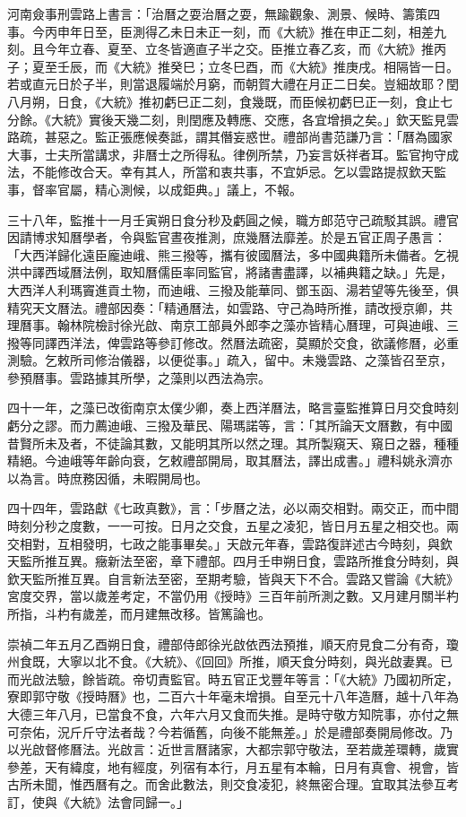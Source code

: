 河南僉事刑雲路上書言：「治曆之耍治曆之耍，無踰觀象、測景、候時、籌策四事。今丙申年日至，臣測得乙未日未正一刻，而《大統》推在申正二刻，相差九刻。且今年立春、夏至、立冬皆適直子半之交。臣推立春乙亥，而《大統》推丙子；夏至壬辰，而《大統》推癸巳；立冬巳酉，而《大統》推庚戌。相隔皆一日。若或直元日於子半，則當退履端於月窮，而朝賀大禮在月正二日矣。豈細故耶？閏八月朔，日食，《大統》推初虧巳正二刻，食幾既，而臣候初虧巳正一刻，食止七分餘。《大統》實後天幾二刻，則閏應及轉應、交應，各宜增損之矣。」欽天監見雲路疏，甚惡之。監正張應候奏詆，謂其僭妄惑世。禮部尚書范謙乃言：「曆為國家大事，士夫所當講求，非曆士之所得私。律例所禁，乃妄言妖祥者耳。監官拘守成法，不能修改合天。幸有其人，所當和衷共事，不宜妒忌。乞以雲路提叔欽天監事，督率官屬，精心測候，以成鉅典。」議上，不報。

三十八年，監推十一月壬寅朔日食分秒及虧圓之候，職方郎范守己疏駁其誤。禮官因請博求知曆學者，令與監官晝夜推測，庶幾曆法靡差。於是五官正周子愚言：「大西洋歸化遠臣龐迪峨、熊三撥等，攜有彼國曆法，多中國典籍所未備者。乞視洪中譯西域曆法例，取知曆儒臣率同監官，將諸書盡譯，以補典籍之缺。」先是，大西洋人利瑪竇進貢土物，而迪峨、三撥及能華同、鄧玉函、湯若望等先後至，俱精究天文曆法。禮部因奏：「精通曆法，如雲路、守己為時所推，請改授京卿，共理曆事。翰林院檢討徐光啟、南京工部員外郎李之藻亦皆精心曆理，可與迪峨、三撥等同譯西洋法，俾雲路等參訂修改。然曆法疏密，莫顯於交食，欲議修曆，必重測驗。乞敕所司修治儀器，以便從事。」疏入，留中。未幾雲路、之藻皆召至京，參預曆事。雲路據其所學，之藻則以西法為宗。

四十一年，之藻已改銜南京太僕少卿，奏上西洋曆法，略言臺監推算日月交食時刻虧分之謬。而力薦迪峨、三撥及華民、陽瑪諾等，言：「其所論天文曆數，有中國昔賢所未及者，不徒論其數，又能明其所以然之理。其所製窺天、窺日之器，種種精絕。今迪峨等年齡向衰，乞敕禮部開局，取其曆法，譯出成書。」禮科姚永濟亦以為言。時庶務因循，未暇開局也。

四十四年，雲路獻《七政真數》，言：「步曆之法，必以兩交相對。兩交正，而中間時刻分秒之度數，一一可按。日月之交食，五星之凌犯，皆日月五星之相交也。兩交相對，互相發明，七政之能事畢矣。」天啟元年春，雲路復詳述古今時刻，與欽天監所推互異。癥新法至密，章下禮部。四月壬申朔日食，雲路所推食分時刻，與欽天監所推互異。自言新法至密，至期考驗，皆與天下不合。雲路又嘗論《大統》宮度交界，當以歲差考定，不當仍用《授時》三百年前所測之數。又月建月關半杓所指，斗杓有歲差，而月建無改移。皆篤論也。

崇禎二年五月乙酉朔日食，禮部侍郎徐光啟依西法預推，順天府見食二分有奇，瓊州食既，大寧以北不食。《大統》、《回回》所推，順天食分時刻，與光啟妻異。已而光啟法驗，餘皆疏。帝切責監官。時五官正戈豐年等言：「《大統》乃國初所定，寮即郭守敬《授時曆》也，二百六十年毫未增損。自至元十八年造曆，越十八年為大德三年八月，已當食不食，六年六月又食而失推。是時守敬方知院事，亦付之無可奈佑，況斤斤守法者哉？今若循舊，向後不能無差。」於是禮部奏開局修改。乃以光啟督修曆法。光啟言：近世言曆諸家，大都宗郭守敬法，至若歲差環轉，歲實參差，天有緯度，地有經度，列宿有本行，月五星有本輪，日月有真會、視會，皆古所未聞，惟西曆有之。而舍此數法，則交食凌犯，終無密合理。宜取其法參互考訂，使與《大統》法會同歸一。」

